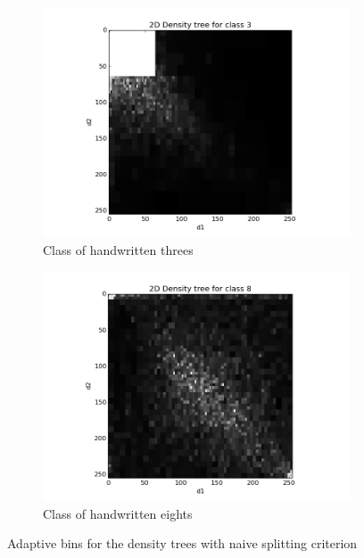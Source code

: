 \documentclass{article}
\begin{document}
\begin{figure}[ht]
        \centering
        \begin{subfigure}[b]{0.5\textwidth}
                \includegraphics[width=\textwidth]{../naiveDT3.png}
                \caption{Class of handwritten threes}
        \end{subfigure}%
        \begin{subfigure}[b]{0.5\textwidth}
                \includegraphics[width=\textwidth]{../naiveDT8.png}
                \caption{Class of handwritten eights}
        \end{subfigure}
        \caption{Adaptive bins for the density trees with naive splitting criterion}
        \label{img4}
\end{figure}
\end{document}
